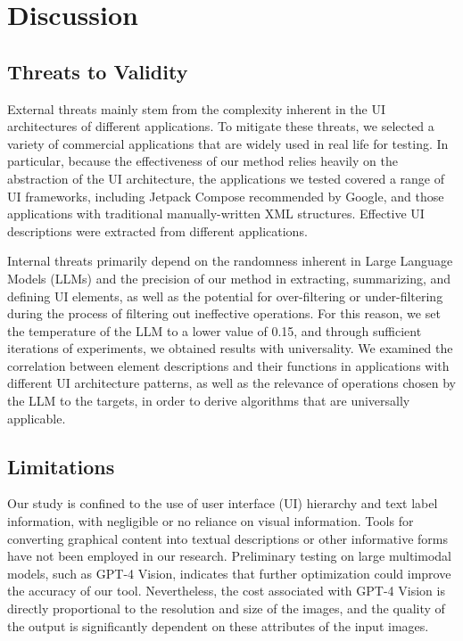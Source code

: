\documentclass[conference]{IEEEtran}
\begin{document}
\section{Discussion}

\subsection{Threats to Validity}
External threats mainly stem from the complexity inherent in the UI architectures of different applications. To mitigate these threats, we selected a variety of commercial applications that are widely used in real life for testing. In particular, because the effectiveness of our method relies heavily on the abstraction of the UI architecture, the applications we tested covered a range of UI frameworks, including Jetpack Compose recommended by Google, and those applications with traditional manually-written XML structures. Effective UI descriptions were extracted from different applications.

Internal threats primarily depend on the randomness inherent in Large Language Models (LLMs) and the precision of our method in extracting, summarizing, and defining UI elements, as well as the potential for over-filtering or under-filtering during the process of filtering out ineffective operations. For this reason, we set the temperature of the LLM to a lower value of 0.15, and through sufficient iterations of experiments, we obtained results with universality. We examined the correlation between element descriptions and their functions in applications with different UI architecture patterns, as well as the relevance of operations chosen by the LLM to the targets, in order to derive algorithms that are universally applicable.

\subsection{Limitations}
Our study is confined to the use of user interface (UI) hierarchy and text label information, with negligible or no reliance on visual information. Tools for converting graphical content into textual descriptions or other informative forms have not been employed in our research. Preliminary testing on large multimodal models, such as GPT-4 Vision\cite{openai_gpt-4v}, indicates that further optimization could improve the accuracy of our tool. Nevertheless, the cost associated with GPT-4 Vision is directly proportional to the resolution and size of the images, and the quality of the output is significantly dependent on these attributes of the input images.
\end{document}
